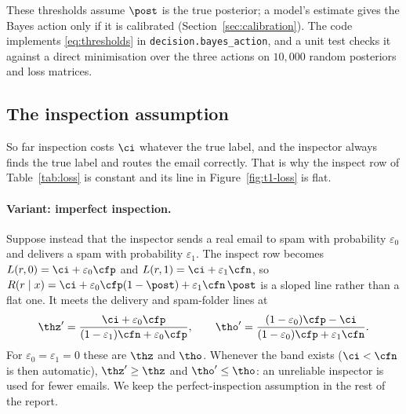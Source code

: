 \noindent These thresholds assume $\post$ is the true posterior; a model's estimate gives the Bayes
action only if it is calibrated (Section~\ref{sec:calibration}). The code implements
\eqref{eq:thresholds} in \texttt{decision.bayes\_action}, and a unit test checks it against a direct
minimisation over the three actions on $10{,}000$ random posteriors and loss matrices.

\subsection{The inspection assumption}
\label{sec:inspection}

So far inspection costs $\ci$ whatever the true label, and the inspector always finds the true label
and routes the email correctly. That is why the inspect row of Table~\ref{tab:loss} is constant and
its line in Figure~\ref{fig:t1-loss} is flat.

\paragraph{Variant: imperfect inspection.}
Suppose instead that the inspector sends a real email to spam with probability $\varepsilon_0$ and
delivers a spam with probability $\varepsilon_1$. The inspect row becomes
$L(r,0)=\ci+\varepsilon_0\cfp$ and $L(r,1)=\ci+\varepsilon_1\cfn$, so
$R(r\mid x)=\ci+\varepsilon_0\cfp(1-\post)+\varepsilon_1\cfn\,\post$ is a sloped line rather than a
flat one. It meets the delivery and spam-folder lines at
\[
  \thz' = \frac{\ci+\varepsilon_0\cfp}{(1-\varepsilon_1)\cfn+\varepsilon_0\cfp},
  \qquad
  \tho' = \frac{(1-\varepsilon_0)\cfp-\ci}{(1-\varepsilon_0)\cfp+\varepsilon_1\cfn}.
\]
For $\varepsilon_0=\varepsilon_1=0$ these are $\thz$ and $\tho$. Whenever the band exists
($\ci<\cfn$ is then automatic), $\thz'\ge\thz$ and $\tho'\le\tho$: an unreliable inspector is used for
fewer emails. We keep the perfect-inspection assumption in the rest of the report.
